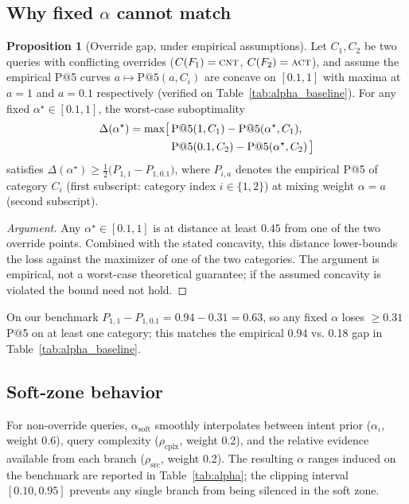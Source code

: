 ﻿\documentclass[conference]{IEEEtran}
\theoremstyle{definition}
\newtheorem{proposition}{Proposition}
\begin{document}
\subsection{Why fixed \texorpdfstring{$\alpha$}{alpha} cannot match}
\begin{proposition}[Override gap, under empirical assumptions]
\label{lem:mono}
Let $C_1,C_2$ be two queries with conflicting overrides ($C(F_1)=\textsc{cnt}$, $C(F_2)=\textsc{act}$), and assume the empirical P@5 curves $a\mapsto\mathrm{P@5}(a, C_i)$ are concave on $[0.1,1]$ with maxima at $a=1$ and $a=0.1$ respectively (verified on Table~\ref{tab:alpha_baseline}). For any fixed $\alpha^\star\in[0.1,1]$, the worst-case suboptimality
\begin{align}
\Delta(\alpha^\star) = \max\bigl[\,&\mathrm{P@5}(1, C_1) - \mathrm{P@5}(\alpha^\star, C_1),\notag\\
&\mathrm{P@5}(0.1, C_2) - \mathrm{P@5}(\alpha^\star, C_2)\,\bigr]
\end{align}
satisfies $\Delta(\alpha^\star)\ge \tfrac12\bigl(P_{1,1}-P_{1,0.1}\bigr)$, where $P_{i,a}$ denotes the empirical P@5 of category $C_i$ (first subscript: category index $i\in\{1,2\}$) at mixing weight $\alpha=a$ (second subscript).
\end{proposition}
\begin{proof}[Argument]
Any $\alpha^\star\in[0.1,1]$ is at distance at least $0.45$ from one of the two override points. Combined with the stated concavity, this distance lower-bounds the loss against the maximizer of one of the two categories. The argument is empirical, not a worst-case theoretical guarantee; if the assumed concavity is violated the bound need not hold.
\end{proof}
On our benchmark $P_{1,1}-P_{1,0.1}=0.94-0.31=0.63$, so any fixed $\alpha$ loses $\ge 0.31$ P@5 on at least one category; this matches the empirical 0.94 vs. 0.18 gap in Table~\ref{tab:alpha_baseline}.

\subsection{Soft-zone behavior}
For non-override queries, $\alpha_{\text{soft}}$ smoothly interpolates between intent prior ($\alpha_\iota$, weight 0.6), query complexity ($\rho_{\text{cplx}}$, weight 0.2), and the relative evidence available from each branch ($\rho_{\text{src}}$, weight 0.2). The resulting $\alpha$ ranges induced on the benchmark are reported in Table~\ref{tab:alpha}; the clipping interval $[0.10, 0.95]$ prevents any single branch from being silenced in the soft zone.
\end{document}
